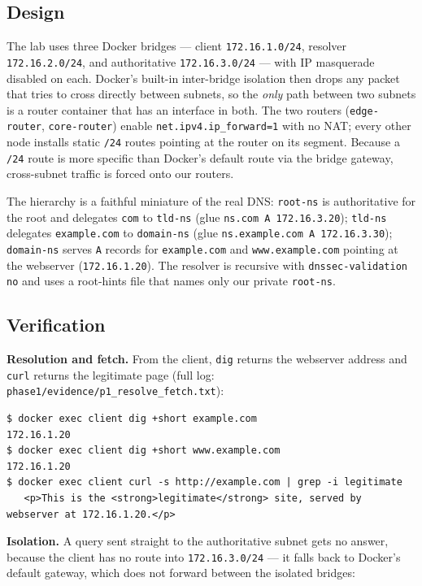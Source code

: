 \documentclass[11pt,a4paper]{article}
\begin{document}
\subsection{Design}
The lab uses three Docker bridges --- client \texttt{172.16.1.0/24}, resolver
\texttt{172.16.2.0/24}, and authoritative \texttt{172.16.3.0/24} --- with IP masquerade disabled
on each. Docker's built-in inter-bridge isolation then drops any packet that tries to cross
directly between subnets, so the \emph{only} path between two subnets is a router container that
has an interface in both. The two routers (\texttt{edge-router}, \texttt{core-router}) enable
\texttt{net.ipv4.ip\_forward=1} with no NAT; every other node installs static \texttt{/24} routes
pointing at the router on its segment. Because a \texttt{/24} route is more specific than Docker's
default route via the bridge gateway, cross-subnet traffic is forced onto our routers.

The hierarchy is a faithful miniature of the real DNS: \texttt{root-ns} is authoritative for the
root and delegates \texttt{com} to \texttt{tld-ns} (glue \texttt{ns.com A 172.16.3.20});
\texttt{tld-ns} delegates \texttt{example.com} to \texttt{domain-ns} (glue
\texttt{ns.example.com A 172.16.3.30}); \texttt{domain-ns} serves \texttt{A} records for
\texttt{example.com} and \texttt{www.example.com} pointing at the webserver
(\texttt{172.16.1.20}). The resolver is recursive with \texttt{dnssec-validation no} and uses a
root-hints file that names only our private \texttt{root-ns}.

\subsection{Verification}
\textbf{Resolution and fetch.} From the client, \texttt{dig} returns the webserver address and
\texttt{curl} returns the legitimate page (full log: \texttt{phase1/evidence/p1\_resolve\_fetch.txt}):

\begin{lstlisting}
$ docker exec client dig +short example.com
172.16.1.20
$ docker exec client dig +short www.example.com
172.16.1.20
$ docker exec client curl -s http://example.com | grep -i legitimate
   <p>This is the <strong>legitimate</strong> site, served by webserver at 172.16.1.20.</p>
\end{lstlisting}

\textbf{Isolation.} A query sent straight to the authoritative subnet gets no answer, because the
client has no route into \texttt{172.16.3.0/24} --- it falls back to Docker's default gateway,
which does not forward between the isolated bridges:
\end{document}
